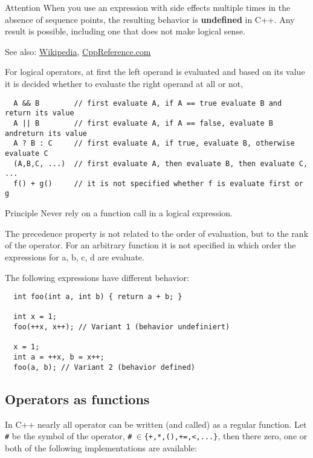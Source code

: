{\begin{guideline}{Attention}
  When you use an expression with side effects multiple times in the absence of sequence points, the resulting behavior is \textbf{undefined} in C++.
  Any result is possible, including one that does not make logical sense.
\end{guideline}

See also: \href{http://en.wikipedia.org/wiki/Sequence_point}{Wikipedia}, \href{http://en.cppreference.com/w/cpp/language/eval_order}{CppReference.com}

For logical operators, at first the left operand is evaluated and based on its value it is decided whether to evaluate the right operand
at all or not, \ie
\begin{verbatim}
  A && B        // first evaluate A, if A == true evaluate B and return its value
  A || B        // first evaluate A, if A == false, evaluate B andreturn its value
  A ? B : C     // first evaluate A, if true, evaluate B, otherwise evaluate C
  (A,B,C, ...)  // first evaluate A, then evaluate B, then evaluate C, ...
  f() + g()     // it is not specified whether f is evaluate first or g
\end{verbatim}

\begin{guideline}{Principle}
  Never rely on a function call in a logical expression.
\end{guideline}

\begin{rem}
  The precedence property is not related to the order of evaluation, but to the rank of the operator. For an arbitrary function  it
  is not specified in which order the expressions for a, b, c, d are evaluate.
\end{rem}

\begin{example}
  The following expressions have different behavior:
  \begin{verbatim}
  int foo(int a, int b) { return a + b; }

  int x = 1;
  foo(++x, x++); // Variant 1 (behavior undefiniert)

  x = 1;
  int a = ++x, b = x++;
  foo(a, b); // Variant 2 (behavior defined)
  \end{verbatim}
\end{example}


\subsection{Operators as functions}
In C++ nearly all operator can be written (and called) as a regular function. Let \texttt{\#} be the symbol of the operator, \eg
\texttt{\#$~\in$\{+,*,(),+=,<,...\}}, then there zero, one or both of the following implementations are available:

}
